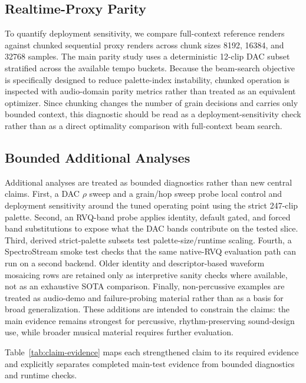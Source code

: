 \documentclass[twoside,a4paper]{article}
\begin{document}
\subsection{Realtime-Proxy Parity}

To quantify deployment sensitivity, we compare full-context reference renders against chunked sequential proxy renders across chunk sizes 8192, 16384, and 32768 samples. The main parity study uses a deterministic 12-clip DAC subset stratified across the available tempo buckets. Because the beam-search objective is specifically designed to reduce palette-index instability, chunked operation is inspected with audio-domain parity metrics rather than treated as an equivalent optimizer. Since chunking changes the number of grain decisions and carries only bounded context, this diagnostic should be read as a deployment-sensitivity check rather than as a direct optimality comparison with full-context beam search.

\subsection{Bounded Additional Analyses}

Additional analyses are treated as bounded diagnostics rather than new central claims. First, a DAC $\rho$ sweep and a grain/hop sweep probe local control and deployment sensitivity around the tuned operating point using the strict 247-clip palette. Second, an RVQ-band probe applies identity, default gated, and forced band substitutions to expose what the DAC bands contribute on the tested slice. Third, derived strict-palette subsets test palette-size/runtime scaling. Fourth, a SpectroStream smoke test checks that the same native-RVQ evaluation path can run on a second backend. Older identity and descriptor-based waveform mosaicing rows are retained only as interpretive sanity checks where available, not as an exhaustive SOTA comparison. Finally, non-percussive examples are treated as audio-demo and failure-probing material rather than as a basis for broad generalization. These additions are intended to constrain the claims: the main evidence remains strongest for percussive, rhythm-preserving sound-design use, while broader musical material requires further evaluation.

Table~\ref{tab:claim-evidence} maps each strengthened claim to its required evidence and explicitly separates completed main-test evidence from bounded diagnostics and runtime checks.


\end{document}
